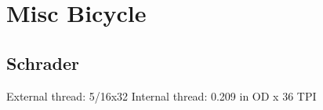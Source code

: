 \section{Misc Bicycle}
\subsection{Schrader}
External thread:  5/16x32
Internal thread:  0.209 in OD x 36 TPI
